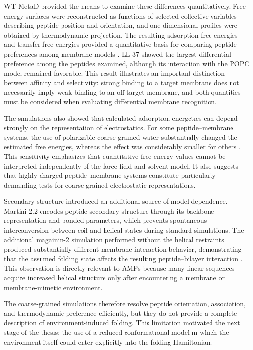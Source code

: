 WT-MetaD provided the means to examine these differences quantitatively. Free-energy surfaces were reconstructed as functions of selected collective variables describing peptide position and orientation, and one-dimensional profiles were obtained by thermodynamic projection. The resulting adsorption free energies and transfer free energies provided a quantitative basis for comparing peptide preferences among membrane models \cite{DANI_METADINAMICA}. LL-37 showed the largest differential preference among the peptides examined, although its interaction with the POPC model remained favorable. This result illustrates an important distinction between affinity and selectivity: strong binding to a target membrane does not necessarily imply weak binding to an off-target membrane, and both quantities must be considered when evaluating differential membrane recognition.

The simulations also showed that calculated adsorption energetics can depend strongly on the representation of electrostatics. For some peptide--membrane systems, the use of polarizable coarse-grained water substantially changed the estimated free energies, whereas the effect was considerably smaller for others \cite{DANI_METADINAMICA}. This sensitivity emphasizes that quantitative free-energy values cannot be interpreted independently of the force field and solvent model. It also suggests that highly charged peptide--membrane systems constitute particularly demanding tests for coarse-grained electrostatic representations.

Secondary structure introduced an additional source of model dependence. Martini 2.2 encodes peptide secondary structure through its backbone representation and bonded parameters, which prevents spontaneous interconversion between coil and helical states during standard simulations. The additional magainin-2 simulation performed without the helical restraints produced substantially different membrane-interaction behavior, demonstrating that the assumed folding state affects the resulting peptide--bilayer interaction \cite{DANI_METADINAMICA}. This observation is directly relevant to AMPs because many linear sequences acquire increased helical structure only after encountering a membrane or membrane-mimetic environment.

The coarse-grained simulations therefore resolve peptide orientation, association, and thermodynamic preference efficiently, but they do not provide a complete description of environment-induced folding. This limitation motivated the next stage of the thesis: the use of a reduced conformational model in which the environment itself could enter explicitly into the folding Hamiltonian.

